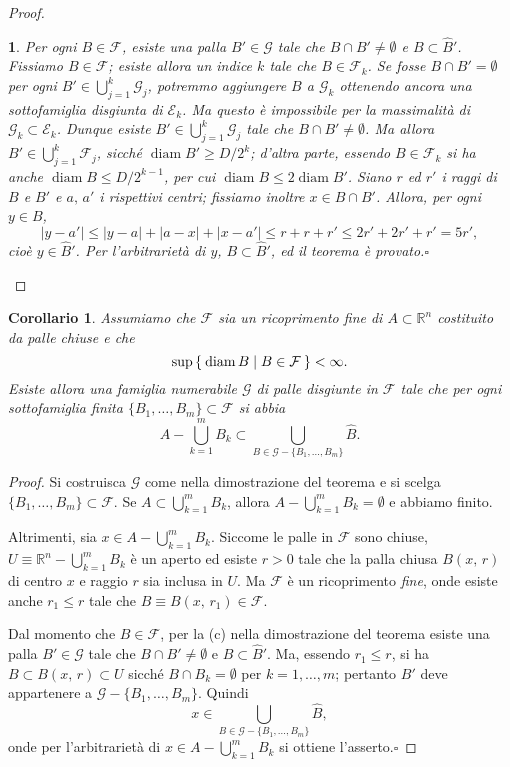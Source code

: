 \documentclass[a4paper,10pt,openright,oneside]{book}
\theoremstyle{theoremstyle}
\newtheorem{corollario}[teorema]{Corollario}
\theoremstyle{theoremstylewoheader}
\theoremstyle{theoremstyle}
\theoremstyle{proofsecstyle}
\newtheorem{proofsec}{}
\theoremstyle{nonumberplain}
\newtheorem{proof}{Dim.}
\newcommand{\EE}{\ensuremath{\mathcal{E}}}
\newcommand{\FF}{\ensuremath{\mathcal{F}}}
\newcommand{\GG}{\ensuremath{\mathcal{G}}}
\newcommand{\RR}{\ensuremath{\mathbb{R}}}
\newcommand{\abs}[1]{\ensuremath{\lvert #1 \rvert}}
\DeclareMathOperator{\diam}{diam}
\renewcommand{\qedsymbol}{\ensuremath{\square}}
\newcommand{\qed}{\unskip\nobreak\hfill\nobreak\hspace{.5em}\qedsymbol}
\begin{document}
\begin{proof}
\begin{proofsec}
\emph{Per ogni $B \in \FF$, esiste una palla $B' \in \GG$ tale che $B \cap B' \ne \emptyset$ e $B \subset \hat{B}'$.}\hspace{.5em} Fissiamo $B \in \FF$; esiste allora un indice $k$ tale che $B \in \FF_k$. Se fosse $B \cap B' = \emptyset$ per ogni $B' \in \bigcup_{j=1}^k \GG_j$, potremmo aggiungere $B$ a $\GG_k$ ottenendo ancora una sottofamiglia disgiunta di $\EE_k$. Ma questo è impossibile per la massimalità di $\GG_k \subset \EE_k$.
Dunque esiste $B' \in \bigcup_{j=1}^k \GG_j$ tale che $B \cap B' \ne \emptyset$. Ma allora $B' \in \bigcup_{j=1}^k \FF_j$, sicché  $\diam B' \ge D/2^k$; d'altra parte, essendo $B \in \FF_k$ si ha anche $\diam B \le D/2^{k-1}$, per cui $\diam B \le 2\diam B'$. Siano $r$ ed $r'$ i raggi di $B$ e $B'$ e $a,\, a'$ i rispettivi centri; fissiamo inoltre $x \in B \cap B'$. Allora, per ogni $y \in B$,
\[
\abs{y - a'} \le \abs{y - a} + \abs{a - x} + \abs{x - a'} \le r + r + r' \le 2r' + 2r' + r' = 5r',
\]
cioè $y \in \hat{B}'$. Per l'arbitrarietà di $y$, $B \subset \hat{B}'$, ed il teorema è provato.\qed
\end{proofsec}
\end{proof}

\begin{corollario}
\label{cor:vitali_1}
Assumiamo che $\FF$ sia un ricoprimento fine di $A \subset \RR^n$ costituito da palle chiuse e che
\[
\sup\Set{ \diam B | B \in \FF } < \infty.
\]
Esiste allora una famiglia numerabile $\GG$ di palle disgiunte in $\FF$ tale che per ogni sottofamiglia finita $\{B_1, \ldots, B_m\} \subset \FF$ si abbia
\[
A - \bigcup_{k=1}^m B_k \subset \bigcup_{B \in \GG - \{B_1, \ldots, B_m\}} \hat{B}.
\]
\end{corollario}

\begin{proof}
Si costruisca $\GG$ come nella dimostrazione del teorema e si scelga $\{B_1, \ldots, B_m\} \subset \FF$. Se $A \subset \bigcup_{k=1}^m B_k$, allora $A - \bigcup_{k=1}^m B_k = \emptyset$ e abbiamo finito.

Altrimenti, sia $x \in A - \bigcup_{k=1}^m B_k$. Siccome le palle in $\FF$ sono chiuse, $U \equiv \RR^n - \bigcup_{k=1}^m B_k$ è un aperto ed esiste $r > 0$ tale che la palla chiusa $B(x,\, r)$ di centro $x$ e raggio $r$ sia inclusa in $U$. Ma $\FF$ è un ricoprimento \emph{fine}, onde esiste anche $r_1 \le r$ tale che $B \equiv B(x,\, r_1) \in \FF$.

Dal momento che $B \in \FF$, per la (c) nella dimostrazione del teorema esiste una palla $B' \in \GG$ tale che $B \cap B' \ne \emptyset$ e $B \subset \hat{B}'$. Ma, essendo $r_1 \le r$, si ha $B \subset B(x,\, r) \subset U$ sicché $B \cap B_k = \emptyset$ per $k = 1, \ldots, m$; pertanto $B'$ deve appartenere a $\GG - \{B_1, \ldots, B_m\}$. Quindi
\[
x \in \bigcup_{B \in \GG - \{B_1, \ldots, B_m\}} \hat{B},
\]
onde per l'arbitrarietà di $x \in A - \bigcup_{k=1}^m B_k$ si ottiene l'asserto.\qed
\end{proof}
\end{document}
